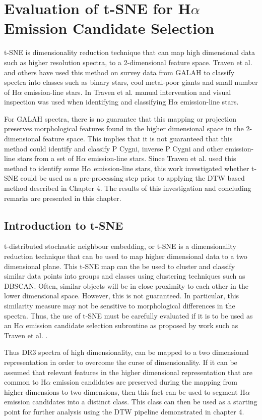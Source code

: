 \chapter{Evaluation of t-SNE for H$\alpha$ Emission Candidate Selection}

t-SNE is dimensionality reduction technique that can map high dimensional data such as higher resolution spectra, to a 2-dimensional feature space. Traven et al. and others have used this method on survey data from GALAH to classify spectra into classes such as binary stars, cool metal-poor giants and small number of H$\alpha$ emission-line stars. In Traven et al. manual intervention and visual inspection was used when identifying and classifying H$\alpha$ emission-line stars.

For GALAH spectra, there is no guarantee that this mapping or projection preserves morphological features found in the higher dimensional space in the 2-dimensional feature space. This implies that it is not guaranteed that this method could identify and classify P Cygni, inverse P Cygni and other emission-line stars from a set of H$\alpha$ emission-line stars. Since Traven et al. used this method to identify some H$\alpha$ emission-line stars, this work investigated whether t-SNE could be used as a pre-processing step prior to applying the DTW based method described in Chapter 4. The results of this investigation and concluding remarks are presented in this chapter.

\section{Introduction to t-SNE}

t-distributed stochastic neighbour embedding, or t-SNE is a dimensionality reduction technique \cite{van2008visualizing} that can be used to map higher dimensional data to a two dimensional plane. This t-SNE map can the be used to cluster and classify similar data points into groups and classes using clustering techniques such as DBSCAN. Often, similar objects will be in close proximity to each other in the lower dimensional space. However, this is not guaranteed. In particular, this similarity measure may not be sensitive to morphological differences in the spectra. Thus, the use of t-SNE must be carefully evaluated if it is to be used as an H$\alpha$ emission candidate selection subroutine as proposed by work such as Traven et al. \cite{traven2017galah}.

Thus DR3 spectra of high dimensionality, can be mapped to a two dimensional representation in order to overcome the curse of dimensionality. If it can be assumed that relevant features in the higher dimensional representation that are common to H$\alpha$ emission candidates are preserved during the mapping from higher dimensions to two dimensions, then this fact can be used to segment H$\alpha$ emission candidates into a distinct class. This class can then be used as a starting point for further analysis using the DTW pipeline demonstrated in chapter 4. 

